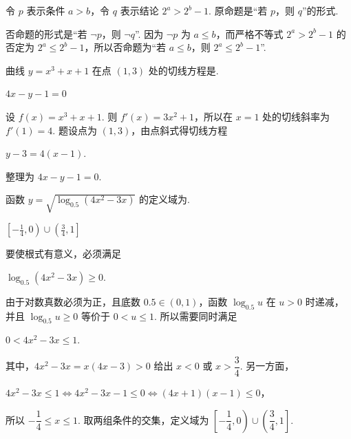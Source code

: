 \begin{solution}
令 \(p\) 表示条件 \(a>b\)，令 \(q\) 表示结论 \(2^a>2^b-1\). 原命题是“若 \(p\)，则 \(q\)”的形式.

否命题的形式是“若 \(\lnot p\)，则 \(\lnot q\)”. 因为 \(\lnot p\) 为 \(a\leqslant b\)，而严格不等式 \(2^a>2^b-1\) 的否定为 \(2^a\leqslant2^b-1\)，所以否命题为“若 \(a\leqslant b\)，则 \(2^a\leqslant2^b-1\)”.
\end{solution}

\begin{problem}
曲线 \(y = x^{3} + x + 1\) 在点 \((1,3)\) 处的切线方程是\fillinblank{}.
\end{problem}

\begin{answer}
\(4x-y-1=0\)
\end{answer}

\begin{solution}
设 \(f(x)=x^3+x+1\). 则 \(f'(x)=3x^2+1\)，所以在 \(x=1\) 处的切线斜率为 \(f'(1)=4\). 题设点为 \((1,3)\)，由点斜式得切线方程

\(y-3=4(x-1)\).

整理为 \(4x-y-1=0\).
\end{solution}

\begin{problem}
函数 \(y = \sqrt{\log_{0.5}(4x^2 - 3x)}\) 的定义域为\fillinblank{}.
\end{problem}

\begin{answer}
\(\left[-\frac{1}{4},0\right)\cup\left(\frac{3}{4},1\right]\)
\end{answer}

\begin{solution}
要使根式有意义，必须满足

\(\log_{0.5}(4x^2-3x)\geqslant0\).

由于对数真数必须为正，且底数 \(0.5\in(0,1)\)，函数 \(\log_{0.5}u\) 在 \(u>0\) 时递减，并且 \(\log_{0.5}u\geqslant0\) 等价于 \(0<u\leqslant1\). 所以需要同时满足

\(0<4x^2-3x\leqslant1\).

其中，\(4x^2-3x=x(4x-3)>0\) 给出 \(x<0\) 或 \(x>\dfrac34\). 另一方面，

\(4x^2-3x\leqslant1\iff4x^2-3x-1\leqslant0\iff(4x+1)(x-1)\leqslant0\)，

所以 \(-\dfrac14\leqslant x\leqslant1\). 取两组条件的交集，定义域为 \(\left[-\dfrac14,0\right)\cup\left(\dfrac34,1\right]\).
\end{solution}

